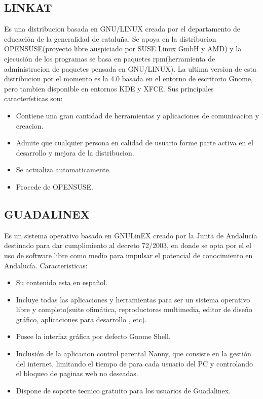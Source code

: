 \subsection*{LINKAT}
Es una distribucion basada en GNU/LINUX creada por el
departamento de educación de la generalidad de cataluña. Se
apoya en la distribucion OPENSUSE(proyecto libre auspiciado
por SUSE Linux GmbH y AMD) y la ejecución de los programas
se basa en paquetes rpm(herramienta de administracion de
paquetes pensada en GNU/LINUX).
La ultima version de esta distribucion por el momento es la 4.0
basada en el entorno de escritorio Gnome, pero tambien
disponible en entornos KDE y XFCE.
Sus principales características son:

\begin{itemize}
  \item Contiene una gran cantidad de herramientas y aplicaciones de comunicacion y creacion.
  \item Admite que cualquier persona en calidad de usuario forme parte activa en el desarrollo y mejora de la distribucion.
  \item Se actualiza automaticamente.
  \item Procede de OPENSUSE.
\end{itemize}

\subsection*{GUADALINEX}
Es un sistema operativo basado en GNULinEX
creado por la Junta de Andalucía destinado para dar
cumplimiento al decreto 72/2003, en donde se opta por el el uso
de software libre como medio para impulsar el potencial de
conocimiento en Andalucía.
Caracteristicas:

\begin{itemize}
  \item Su contenido esta en español.
  \item Incluye todas las aplicaciones y herramientas para ser un sistema operativo libre y completo(suite ofimática, reproductores multimedia, editor de diseño gráfico, aplicaciones para desarrollo , etc).
  \item Posee la interfaz gráfica por defecto Gnome Shell.
  \item Inclusión de la aplicacion control parental Nanny, que consiste en la gestión del internet, limitando el tiempo de para cada usuario del PC y controlando el bloqueo de paginas web no deseadas.
  \item Dispone de soporte tecnico gratuito para los usuarios de Guadalinex.
\end{itemize}

